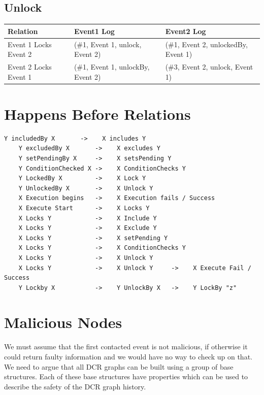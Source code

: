 \subsection{Unlock}
\begin{tabularx}{\textwidth}{|*{3}{>{\raggedright\arraybackslash}X|}}
  \hline
  Relation & Event1 Log & Event2 Log \\
  \hline
  Event 1 Locks Event 2 & (\#1, Event 1, unlock, Event 2) & (\#1, Event 2, unlockedBy, Event 1) \\
  \hline
  Event 2 Locks Event 1 & (\#1, Event 1, unlockBy, Event 2) & (\#3, Event 2, unlock, Event 1) \\
  \hline
\end{tabularx}

\section{Happens Before Relations}

\begin{lstlisting}[breaklines=true]
    Y includedBy X       ->    X includes Y
    Y excludedBy X       ->    X excludes Y
    Y setPendingBy X     ->    X setsPending Y
    Y ConditionChecked X ->    X ConditionChecks Y
    Y LockedBy X         ->    X Lock Y
    Y UnlockedBy X       ->    X Unlock Y
    X Execution begins   ->    X Execution fails / Success
    X Execute Start      ->    X Locks Y
    X Locks Y            ->    X Include Y
    X Locks Y            ->    X Exclude Y
    X Locks Y            ->    X setPending Y
    X Locks Y            ->    X ConditionChecks Y
    X Locks Y            ->    X Unlock Y
    X Locks Y            ->    X Unlock Y     ->    X Execute Fail / Success
    Y Lockby X           ->    Y UnlockBy X   ->    Y LockBy "z"
\end{lstlisting}

\section{Malicious Nodes}
We must assume that the first contacted event is not malicious, if otherwise it could return faulty information and we would have no way to check up on that.
We need to argue that all DCR graphs can be built using a group of base structures. Each of these base structures have properties which can be used to describe the safety of the DCR graph history.

